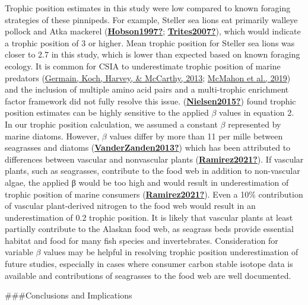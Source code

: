 \documentclass [11pt, proquest] {uwthesis}[2015/03/03]
\begin{document}
Trophic position estimates in this study were low compared to known foraging strategies of these pinnipeds. For example, Steller sea lions eat primarily walleye pollock and Atka mackerel (\protect\hyperlink{ref-Hobson1997}{\textbf{Hobson1997?}}; \protect\hyperlink{ref-Trites2007}{\textbf{Trites2007?}}), which would indicate a trophic position of 3 or higher. Mean trophic position for Steller sea lions was closer to 2.7 in this study, which is lower than expected based on known foraging ecology. It is common for CSIA to underestimate trophic position of marine predators (\protect\hyperlink{ref-Germain2013}{Germain, Koch, Harvey, \& McCarthy, 2013}; \protect\hyperlink{ref-McMahon2019}{McMahon et al., 2019}) and the inclusion of multiple amino acid pairs and a multi-trophic enrichment factor framework did not fully resolve this issue. (\protect\hyperlink{ref-Nielsen2015}{\textbf{Nielsen2015?}}) found trophic position estimates can be highly sensitive to the applied \(\beta\) values in equation 2. In our trophic position calculation, we assumed a constant \(\beta\) represented by marine diatoms. However, \(\beta\) values differ by more than 11 per mille between seagrasses and diatoms (\protect\hyperlink{ref-VanderZanden2013}{\textbf{VanderZanden2013?}}) which has been attributed to differences between vascular and nonvascular plants (\protect\hyperlink{ref-Ramirez2021}{\textbf{Ramirez2021?}}). If vascular plants, such as seagrasses, contribute to the food web in addition to non-vascular algae, the applied β would be too high and would result in underestimation of trophic position of marine consumers (\protect\hyperlink{ref-Ramirez2021}{\textbf{Ramirez2021?}}). Even a 10\% contribution of vascular plant-derived nitrogen to the food web would result in an underestimation of 0.2 trophic position. It is likely that vascular plants at least partially contribute to the Alaskan food web, as seagrass beds provide essential habitat and food for many fish species and invertebrates. Consideration for variable \(\beta\) values may be helpful in resolving trophic position underestimation of future studies, especially in cases where consumer carbon stable isotope data is available and contributions of seagrasses to the food web are well documented.

\#\#\#Conclusions and Implications
\end{document}
